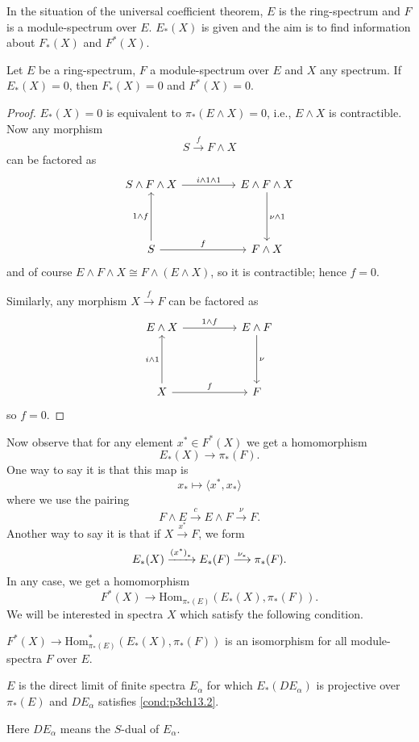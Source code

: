 \documentclass[../main]{subfiles}
\begin{document}
In the situation of the universal coefficient theorem, $E$ is the ring-spectrum and $F$ is a module-spectrum over $E$. $E_\ast(X)$ is given and the aim is to find information about $F_\ast(X)$ and $F^\ast(X)$.

\begin{lemma}\label{lem:p3ch13.1}
Let $E$ be a ring-spectrum, $F$ a module-spectrum over $E$ and $X$ any spectrum. If $E_\ast(X) = 0$, then $F_\ast(X) = 0$ and $F^\ast(X) = 0$.
\end{lemma}
\begin{proof}
$E_*(X) = 0$ is equivalent to $\pi_\ast(E\wedge X) = 0$, i.e., $E\wedge X$ is contractible. Now any morphism \[S\overset{f}{\longrightarrow}F\wedge X\]
can be factored as
\[\begin{tikzcd}
	{S\wedge F \wedge X} && {E\wedge F \wedge X} \\
	&& {} \\
	S && {F \wedge X}
	\arrow["{i\wedge 1\wedge1}", from=1-1, to=1-3]
	\arrow["{\nu \wedge1}", from=1-3, to=3-3]
	\arrow["{1\wedge f}", from=3-1, to=1-1]
	\arrow["f", from=3-1, to=3-3]
\end{tikzcd}\]
and of course $E \wedge F\wedge X \cong F \wedge(E \wedge X)$, so it is contractible; hence $f=0$.

Similarly, any morphism $X\overset{f}{\longrightarrow}F$ can be factored as
\[\begin{tikzcd}
	{E \wedge X} && {E\wedge F} \\
	&& {} \\
	X && F
	\arrow["{1\wedge f}", from=1-1, to=1-3]
	\arrow["{\nu}", from=1-3, to=3-3]
	\arrow["{i\wedge 1}", from=3-1, to=1-1]
	\arrow["f", from=3-1, to=3-3]
\end{tikzcd}\]
so $f=0$.
\end{proof}
Now observe that for any element $x^\ast \in F^\ast(X)$ we get a homomorphism
\[E_\ast(X)\longrightarrow \pi_\ast(F).\]
One way to say it is that this map is
\[x_\ast \mapsto \langle x^\ast, x_\ast \rangle\]
where we use the pairing 
\[F\wedge E \overset{c}{\longrightarrow} E\wedge F \overset{\nu}{\longrightarrow} F.\]
Another way to say it is that if $X\overset{x^\ast}{\longrightarrow}F$, we form
\[E_\ast(X)\vra{\left(x^\ast\right)_\ast}E_\ast(F)\overset{\nu_\ast}{\longrightarrow}\pi_\ast(F).\]
In any case, we get a homomorphism
\[F^\ast(X)\longrightarrow \text{Hom}_{\pi_\ast(E)}(E_\ast(X), \pi_\ast(F)).\]
We will be interested in spectra $X$ which satisfy the following condition.

\begin{condition}\label{cond:p3ch13.2} $F^\ast(X)\longrightarrow\text{Hom}^\ast_{\pi_\ast(E)}(E_\ast(X), \pi_\ast(F))$ is an isomorphism for all module-spectra $F$ over $E$.
\end{condition}
\begin{condition}\label{cond:p3ch13.3} $E$ is the direct limit of finite spectra $E_\alpha$ for which $E_\ast(DE_\alpha)$ is projective over $\pi_\ast(E)$ and $DE_\alpha$ satisfies \ref{cond:p3ch13.2}.
\end{condition}
Here $DE_\alpha$ means the $S$-dual of $E_\alpha$.
\end{document}
